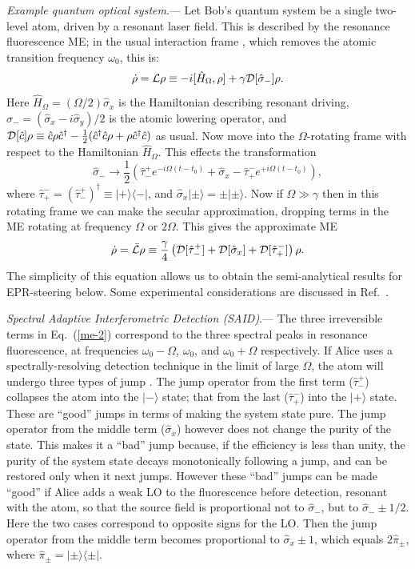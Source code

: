\documentclass[12pt,prl,floatfix,showpacs,superscriptaddress,amsmath,amssymb]{revtex4}
\newcommand{\beq}{\begin{equation}}
\newcommand{\eeq}{\end{equation}}
\newcommand{\erf}[1]{Eq.~(\ref{#1})}
\newcommand{\dg}{^\dagger}
\newcommand{\smallfrac}[2]{\mbox{$\frac{#1}{#2}$}}
\newcommand{\half}{\smallfrac{1}{2}}
\newcommand{\bra}[1]{\langle{#1}|}
\newcommand{\ket}[1]{|{#1}\rangle}
\newcommand{\op}[2]{\hat \tau_{#1}^{#2}}
\renewcommand{\(}{\left(}
\renewcommand{\)}{\right)}
\newcommand{\s}[1]{\hat \sigma_{#1}}
\renewcommand{\section}[1]{{\em #1}.---}
\begin{document}
\section{Example quantum optical system} Let Bob's quantum system be a single two-level atom, driven by a resonant laser field. This is described by the resonance fluorescence 
ME; in the usual interaction frame \cite{WisMil10}, which removes the atomic transition frequency $\omega_0$, this is:
\beq \label{me-1}
\dot\rho = {\cal L}\rho \equiv -i[\hat H_\Omega,\rho]   + \gamma {\cal D}[\s{-}]\rho.
\eeq
Here $\hat H_\Omega = (\Omega/2)\s{x}$ is the Hamiltonian describing resonant driving, $\s{-}=(\s{x}-i\s{y})/2$ is the atomic lowering operator, and ${\cal D}[\hat c]\rho \equiv \hat c\rho \hat c\dg - \half(\hat c\dg \hat c \rho + \rho \hat c\dg \hat c)$ as usual.  Now move into the $\Omega$-rotating frame with respect to the Hamiltonian 
$\hat H_\Omega$. This effects the transformation 
\beq \label{eq:rf}
\s{-} \to  \frac{1}{2}\left( \op-+ e^{-i\Omega (t-t_0)}  + \s{x}  - \op+- e^{+i\Omega (t-t_0)} \right),
\eeq
 where  $\op{+}{-} = (\op{-}{+})\dg \equiv \ket{+}\bra{-}$, and $\s{x}\ket{\pm}=\pm\ket{\pm}$.
 Now if $\Omega \gg \gamma$ then in this rotating frame we can make the secular approximation, dropping terms in the ME rotating at frequency $\Omega$ or $2\Omega$. This gives the approximate ME   \beq
\dot\rho = \bar{\cal L}\rho  \equiv \frac{\gamma}{4}\left( {\cal D}[\op-+] + {\cal D}[\s{x}] + {\cal D}[\op+-]\right) \rho . \label{me-2}
\eeq 
The simplicity of this equation allows us to obtain the semi-analytical results for EPR-steering below. Some experimental considerations are discussed in Ref.~\cite{epaps}. 



\section{Spectral Adaptive Interferometric Detection (SAID)}
The three irreversible terms in \erf{me-2} correspond to the three spectral peaks in resonance fluorescence, at frequencies $\omega_0-\Omega$, $\omega_0$, and $\omega_0+\Omega$ respectively.  
If Alice uses a spectrally-resolving detection technique in the limit of large $\Omega$, the atom will undergo three types of jump \cite{WisToo99}. 
The jump operator from the first term ($\op-+$) collapses the atom into the $\ket{-}$ state; that from the last ($\op+-$) into the $\ket{+}$ state. These are ``good'' jumps in terms of making the system state pure. The jump operator from the middle term ($\s{x}$) however does not change the purity of the state. This makes it a ``bad'' jump because, if the efficiency is less than unity,  the purity of the system state decays monotonically following a jump, and can be restored only when it next jumps.  
However these ``bad'' jumps can be made ``good'' if Alice adds a weak LO to the fluorescence before detection, resonant with the atom, so that the source field is proportional not to $\s{-}$, but to $\s{-} \pm 1/2$. Here the two cases correspond to opposite signs for the LO. 
Then the jump operator from the middle term becomes proportional to $\s{x}\pm 1$, which equals $2\hat\pi_\pm$, 
where $\hat\pi_\pm = \ket{\pm}\bra{\pm}$. 
\end{document}
